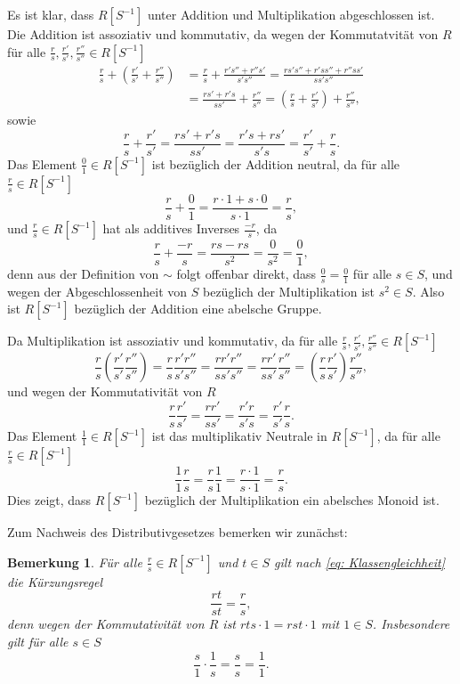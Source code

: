 \documentclass[a4paper,10pt]{article}
\newcounter{satze}
\newtheorem{bem}[satze]{Bemerkung}
\theoremstyle{definition}
\begin{document}
Es ist klar, dass $R[S^{-1}]$ unter Addition und Multiplikation abgeschlossen ist. Die Addition ist assoziativ und kommutativ, da wegen der Kommutatvität von $R$ für alle $\frac{r}{s}, \frac{r'}{s'}, \frac{r''}{s''} \in R[S^{-1}]$
\begin{align*}
 \frac{r}{s} + \left( \frac{r'}{s'} + \frac{r''}{s''} \right)
 &= \frac{r}{s} + \frac{r's''+r''s'}{s's''}
 = \frac{rs's''+r'ss''+r''ss'}{ss's''} \\
 &= \frac{rs'+r's}{ss'} + \frac{r''}{s''}
 = \left(\frac{r}{s} + \frac{r'}{s'}\right) + \frac{r''}{s''},
\end{align*}
sowie
\[
 \frac{r}{s} + \frac{r'}{s'}
 = \frac{rs'+r's}{ss'}
 = \frac{r's+rs'}{s's}
 = \frac{r'}{s'} + \frac{r}{s}.
\]
Das Element $\frac{0}{1} \in R[S^{-1}]$ ist bezüglich der Addition neutral, da für alle $\frac{r}{s} \in R[S^{-1}]$
\[
 \frac{r}{s} + \frac{0}{1} = \frac{r \cdot 1 + s \cdot 0}{s \cdot 1} = \frac{r}{s},
\]
und $\frac{r}{s} \in R[S^{-1}]$ hat als additives Inverses $\frac{-r}{s}$, da
\[
 \frac{r}{s} + \frac{-r}{s} = \frac{rs-rs}{s^2} = \frac{0}{s^2} = \frac{0}{1},
\]
denn aus der Definition von $\sim$ folgt offenbar direkt, dass $\frac{0}{s} = \frac{0}{1}$ für alle $s \in S$, und wegen der Abgeschlossenheit von $S$ bezüglich der Multiplikation ist $s^2 \in S$. Also ist $R[S^{-1}]$ bezüglich der Addition eine abelsche Gruppe.

Da Multiplikation ist assoziativ und kommutativ, da für alle $\frac{r}{s}, \frac{r'}{s'}, \frac{r''}{s''} \in R[S^{-1}]$
\[
 \frac{r}{s} \left( \frac{r'}{s'} \frac{r''}{s''} \right)
 = \frac{r}{s} \frac{r' r''}{s' s''}
 = \frac{r r' r''}{s s' s''}
 = \frac{r r'}{s s'} \frac{r''}{s''}
 = \left( \frac{r}{s} \frac{r'}{s'} \right) \frac{r''}{s''},
\]
und wegen der Kommutativität von $R$
\[
 \frac{r}{s} \frac{r'}{s'}
 = \frac{r r'}{s s'}
 = \frac{r' r}{s' s}
 = \frac{r'}{s'} \frac{r}{s}.
\]
Das Element $\frac{1}{1} \in R[S^{-1}]$ ist das multiplikativ Neutrale in $R[S^{-1}]$, da für alle $\frac{r}{s} \in R[S^{-1}]$
\[
 \frac{1}{1} \frac{r}{s} = \frac{r}{s} \frac{1}{1} = \frac{r \cdot 1}{s \cdot 1} = \frac{r}{s}.
\]
Dies zeigt, dass $R[S^{-1}]$ bezüglich der Multiplikation ein abelsches Monoid ist.

Zum Nachweis des Distributivgesetzes bemerken wir zunächst:

\begin{bem}\label{bem: s als einheiten}
 Für alle $\frac{r}{s} \in R[S^{-1}]$ und $t \in S$ gilt nach \eqref{eq: Klassengleichheit} die Kürzungsregel
 \[
  \frac{rt}{st} = \frac{r}{s},
 \]
 denn wegen der Kommutativität von $R$ ist $rts \cdot 1 = rst \cdot 1$ mit $1 \in S$. Insbesondere gilt für alle $s \in S$
 \[
  \frac{s}{1} \cdot \frac{1}{s} = \frac{s}{s} = \frac{1}{1}.
 \]
\end{bem}
\end{document}
